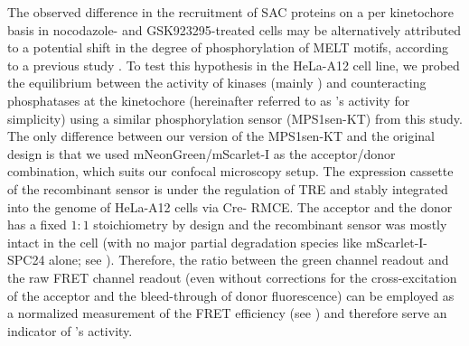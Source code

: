 The observed difference in the recruitment of SAC proteins on a per kinetochore basis in nocodazole- and GSK923295-treated cells may be alternatively attributed to a potential shift in the degree of phosphorylation of MELT motifs, according to a previous study \cite{MPS1senor}. To test this hypothesis in the HeLa-A12 cell line, we probed the equilibrium between the activity of kinases (mainly ) and counteracting phosphatases at the kinetochore (hereinafter referred to as 's activity for simplicity) using a similar phosphorylation sensor (MPS1sen-KT) from this study. The only difference between our version of the MPS1sen-KT and the original design is that we used mNeonGreen/mScarlet-I as the acceptor/donor combination, which suits our confocal microscopy setup. The expression cassette of the recombinant sensor is under the regulation of TRE and stably integrated into the genome of HeLa-A12 cells via Cre- RMCE. The acceptor and the donor has a fixed $1 : 1$ stoichiometry by design and the recombinant sensor was mostly intact in the cell (with no major partial degradation species like mScarlet-I-SPC24 alone; see ). Therefore, the ratio between the green channel readout and the raw FRET channel readout (even without corrections for the cross-excitation of the acceptor and the bleed-through of donor fluorescence) can be employed as a normalized measurement of the FRET efficiency (see ) and therefore serve an indicator of 's activity.

